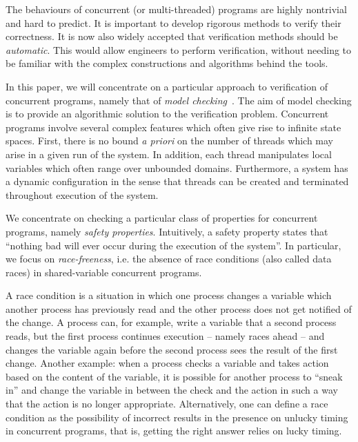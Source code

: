 \label{section:introduction}

The behaviours of concurrent (or multi-threaded) programs are highly
nontrivial and hard to predict. It is important to develop rigorous
methods to verify their correctness. It is now also widely accepted
that verification methods should be \emph{automatic}.
%
This would allow engineers to perform verification, without needing to
be familiar with the complex constructions and algorithms behind the
tools.
%

In this paper, we will concentrate on a particular
approach to  verification of concurrent programs, 
namely that of \emph{model checking}~\cite{CES:modelchecking,QuSi:cesar}.
%
The aim of model checking is to provide an algorithmic solution
to the verification problem.
%
Concurrent programs involve several complex features which often give
rise to infinite state spaces.
%
First, there is no bound \emph{a priori} on the
number of threads which may arise in a given run of the system.
%
In addition, each thread manipulates local variables which often
range over unbounded domains.
%
Furthermore, a system has a dynamic configuration in the sense that
threads can be created and terminated throughout execution of the
system.
%

We concentrate on checking a particular class of properties for
concurrent programs, namely \emph{safety properties}.
%
Intuitively, a safety property states that ``nothing bad will
ever occur during the execution of the system''.
%
In particular, we focus on \emph{race-freeness}, i.e. the absence of
race conditions (also called data races) in shared-variable concurrent
programs.
%

A race condition is a situation in which one process changes a
variable which another process has previously read and the other
process does not get notified of the change.
%
A process can, for example, write a variable that a second process
reads, but the first process continues execution -- namely races ahead
-- and changes the variable again before the second process sees the
result of the first change. Another example: when a process checks a
variable and takes action based on the content of the variable, it is
possible for another process to ``sneak in'' and change the variable
in between the check and the action in such a way that the action is
no longer appropriate.
%
Alternatively, one can define a race condition as the possibility of
incorrect results in the presence on unlucky timing in concurrent
programs, that is, getting the right answer relies on lucky timing.

